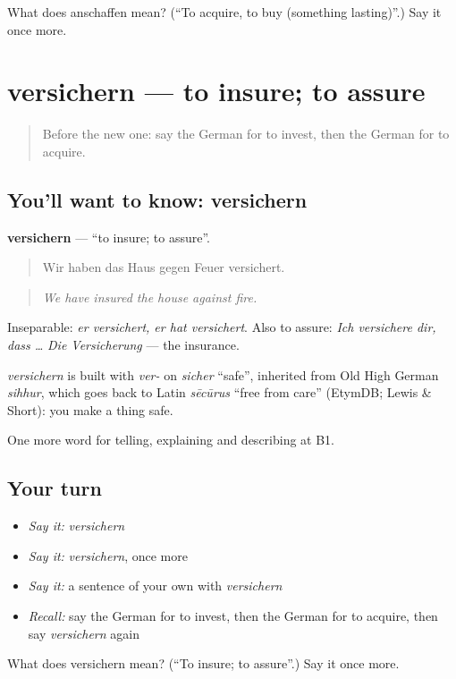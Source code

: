 \begin{tcolorbox}[breakable,colback=teal!4,colframe=teal!35!black,title={Before you move on}]
What does anschaffen mean? (\textquotedblleft{}To acquire, to buy (something lasting)\textquotedblright{}.) Say it once more.
\end{tcolorbox}
\section[versichern]{versichern — to insure; to assure}

\label{lesson:GE-C391-versichern}



\begin{quote}
Before the new one: say the German for to invest, then the German for to acquire.
\end{quote}

\subsection*{You'll want to know: versichern}
\textbf{versichern} — \textquotedblleft{}to insure; to assure\textquotedblright{}.

\begin{quote}
Wir haben das Haus gegen Feuer versichert.
\end{quote}

\begin{quote}
\emph{We have insured the house against fire.}
\end{quote}

Inseparable: \emph{er versichert, er hat versichert}. Also to assure: \emph{Ich versichere dir, dass …} \emph{Die Versicherung} — the insurance.

\begin{cousinweb}
\emph{versichern} is built with \emph{ver-} on \emph{sicher} \textquotedblleft{}safe\textquotedblright{}, inherited from Old High German \emph{sihhur}, which goes back to Latin \emph{sēcūrus} \textquotedblleft{}free from care\textquotedblright{} (EtymDB; Lewis \& Short): you make a thing safe.
\end{cousinweb}

\begin{grammarlens}[title={What you've built}]
One more word for telling, explaining and describing at B1.
\end{grammarlens}

\subsection*{Your turn}
\begin{itemize}
\raggedright
  \item \emph{Say it:} \emph{versichern}
  \item \emph{Say it:} \emph{versichern}, once more
  \item \emph{Say it:} a sentence of your own with \emph{versichern}
  \item \emph{Recall:} say the German for to invest, then the German for to acquire, then say \emph{versichern} again
\end{itemize}

\begin{tcolorbox}[breakable,colback=teal!4,colframe=teal!35!black,title={Before you move on}]
What does versichern mean? (\textquotedblleft{}To insure; to assure\textquotedblright{}.) Say it once more.
\end{tcolorbox}
